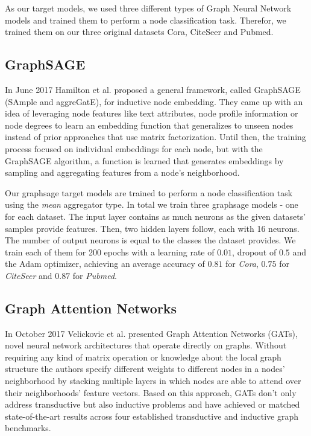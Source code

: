     As our target models, we used three different types of Graph Neural Network models and trained them to perform a node classification task. 
    Therefor, we trained them on our three original datasets Cora, CiteSeer and Pubmed.

    \subsection*{GraphSAGE}
      In June 2017 Hamilton et al.\cite{hamilton2018inductive} proposed a general framework, called GraphSAGE (SAmple and aggreGatE), for inductive node embedding. 
      They came up with an idea of leveraging node features like text attributes, node profile information or node degrees to learn an embedding function that generalizes to unseen nodes instead of prior approaches that use matrix factorization.
      Until then, the training process focused on individual embeddings for each node, but with the GraphSAGE algorithm, a function is learned that generates embeddings by sampling and aggregating features from a node's neighborhood.

      Our graphsage target models are trained to perform a node classification task using the \emph{mean} aggregator type.
      In total we train three graphsage models - one for each dataset.
      The input layer contains as much neurons as the given datasets' samples provide features.
      Then, two hidden layers follow, each with 16 neurons.
      The number of output neurons is equal to the classes the dataset provides.
      We train each of them for 200 epochs with a learning rate of $0.01$, dropout of $0.5$ and the Adam optimizer, achieving an average accuracy of $0.81$ for \emph{Cora}, $0.75$ for \emph{CiteSeer} and $0.87$ for \emph{Pubmed}.

    \subsection*{Graph Attention Networks}
      In October 2017 Velickovic et al.\cite{gat} presented Graph Attention Networks (GATs), novel neural network architectures that operate directly on graphs.
      Without requiring any kind of matrix operation or knowledge about the local graph structure the authors specify different weights to different nodes in a nodes' neighborhood by stacking multiple layers in which nodes are able to attend over their neighborhoods' feature vectors.
      Based on this approach, GATs don't only address transductive but also inductive problems and have achieved or matched state-of-the-art results across four established transductive and inductive graph benchmarks.

